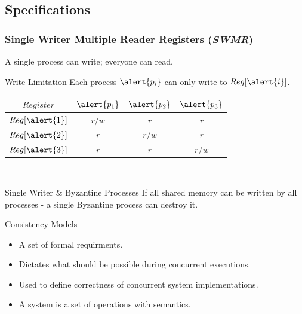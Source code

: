 \subsection{Specifications}
\begin{frame}
    \frametitle{Single Writer Multiple Reader Registers (\emph{SWMR})}
    A single process can write; everyone can read.\\
    \begin{block}{Write Limitation}
    Each process $\alert{p_i}$  can only write to $Reg[\alert{i}]$.
        \begin{center}
            \begin{tabular}{|c|c c c|}
                \hline
                $Register$ & $\alert{p_1}$ & $\alert{p_2}$ & $\alert{p_3}$ \\
                \hline
                $Reg[\alert{1}]$ & \alert{$r/w$} & $r$ & $r$ \\ 
                \hline
                $Reg[\alert{2}]$ & $r$ & \alert{$r/w$} & $r$ \\  
                \hline
                $Reg[\alert{3}]$ & $r$ & $r$ & \alert{$r/w$}\\
                \hline
            \end{tabular}\\
        \end{center}
    \end{block}
    \pause
    \begin{block}{Single Writer \& Byzantine Processes}
        If all shared memory can be written by all processes - a single Byzantine process can destroy it.
    \end{block}
\end{frame}
\begin{frame}{Consistency Models}
    \begin{itemize}
        \item A set of formal requirments.
        \pause
        \item Dictates what should be possible during concurrent executions.
        \pause
        \item Used to define correctness of concurrent system implementations.
        \pause
        \item A system is a set of \alert{operations} with \alert{semantics}.
    \end{itemize}
\end{frame}
